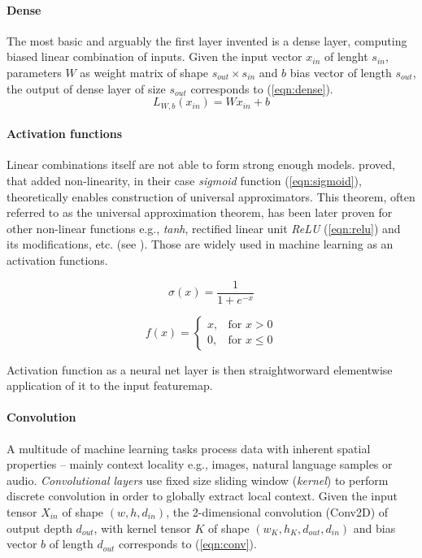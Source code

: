 \paragraph{Dense}
The most basic and arguably the first layer invented is a dense layer, computing biased linear combination of inputs. Given the input vector $x_{in}$ of lenght $s_{in}$, parameters $W$ as weight matrix of shape $s_{out} \times s_{in}$ and $b$ bias vector of length $s_{out}$, the output of dense layer of size $s_{out}$ corresponds to (\ref{eqn:dense}).
\begin{equation} \label{eqn:dense}
L_{W, b}(x_{in}) = W x_{in} + b
\end{equation}

\paragraph{Activation functions}
Linear combinations itself are not able to form strong enough models. \cite{Cybenko1989} proved, that added non-linearity, in their case \emph{sigmoid} function (\ref{eqn:sigmoid}), theoretically enables construction of universal approximators. This theorem, often referred to as the universal approximation theorem, has been later proven for other non-linear functions e.g., \emph{tanh}, rectified linear unit \emph{ReLU} (\ref{eqn:relu}) and its modifications, etc. (see \cite{DBLP:journals/corr/SonodaM15}). Those are widely used in machine learning as an activation functions.

\begin{equation} \label{eqn:sigmoid}
\sigma(x) = \frac{1}{1 + e^{-x}}
\end{equation}

\begin{equation} \label{eqn:relu}
f(x) =
\begin{cases}
    x, & \text{for } x > 0 \\
    0, & \text{for } x \leq 0
\end{cases}
\end{equation}

\noindent Activation function as a neural net layer is then straightworward elementwise application of it to the input featuremap.

\paragraph{Convolution}
A multitude of machine learning tasks process data with inherent spatial properties -- mainly context locality e.g., images, natural language samples or audio. \emph{Convolutional layers} use fixed size sliding window (\emph{kernel}) to perform discrete convolution in order to globally extract local context. Given the input tensor $X_{in}$ of shape $(w, h, d_{in})$, the 2-dimensional convolution (Conv2D) of output depth $d_{out}$, with kernel tensor $K$ of shape $(w_K, h_K, d_{out}, d_{in})$ and bias vector $b$ of length $d_{out}$ corresponds to (\ref{eqn:conv}).

